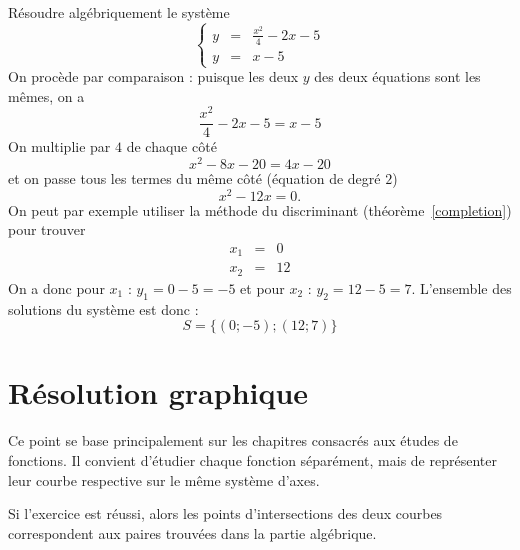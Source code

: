 \begin{exemple}\label{exemplesystemequad}
Résoudre algébriquement le système 
$$
\left\{
\begin{array}{lcl}
y &=& \frac{x^2}{4}-2x-5\\
y &=& x-5
\end{array}
\right.
$$
On procède par comparaison : puisque les deux $y$ des deux équations sont les mêmes, on a 
$$
\frac{x^2}{4}-2x-5 = x-5
$$
On multiplie par $4$ de chaque côté
$$
x^2-8x-20 = 4x-20
$$
et on passe tous les termes du même côté (équation de degré $2$)
$$
x^2-12x = 0.
$$
On peut par exemple utiliser la méthode du discriminant (théorème~\ref{completion}) pour trouver 
$$
\begin{array}{lcl}
x_1 &=& 0\\
x_2 &=& 12
\end{array}
$$
On a donc pour $x_1$ : $y_1 = 0 -5 = -5$ et pour $x_2$ : $y_2 = 12-5 = 7$. L'ensemble des solutions du système est donc :
$$
S=\{(0;-5);(12;7)\}
$$
\end{exemple}

\section{Résolution graphique}

Ce point se base principalement sur les chapitres consacrés aux études de fonctions. Il convient d'étudier chaque fonction séparément, mais de représenter leur courbe respective sur le même système d'axes.

Si l'exercice est réussi, alors les points d'intersections des deux courbes correspondent aux paires trouvées dans la partie algébrique.

